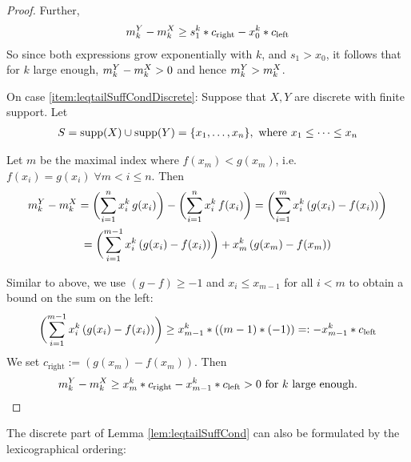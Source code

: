 \documentclass[a4paper]{scrreprt}
\begin{document}
\begin{proof}
        Further,
        \begin{gather*}
            m_k^Y - m_k^X
            \geq s_1^k * c_{\text{right}} - x_0^k * c_{\text{left}}
        \end{gather*}
        So since both expressions grow exponentially with $k$, and $s_1 > x_0$, it follows that for $k$ large enough, $m_k^Y - m_k^X > 0$ and hence $m_k^Y > m_k^X$.
        
        
        On case \ref{item:leqtailSuffCondDiscrete}: Suppose that $X, Y$ are discrete with finite support. Let 
        \begin{gather*}
            S = \operatorname{supp}(X) \cup \operatorname{supp}(Y) = \{x_1, \dots, x_n\}, \text{ where } x_1 \leq \dots \leq x_n
        \end{gather*}
        
        Let $m$ be the maximal index where $f(x_m) < g(x_m)$, i.e. $f(x_i) = g(x_i) \;\forall m < i \leq n$.
        Then
        \begin{multline*}
            m_k^Y - m_k^X
            = \biggl(\sum_{i=1}^{n} x_i^k \,g(x_i)\biggr) - \biggl(\sum_{i=1}^{n} x_i^k \,f(x_i)\biggr)
            = \biggl(\sum_{i=1}^{m} x_i^k \,(g(x_i) - f(x_i))\biggr) \\
            = \biggl(\sum_{i=1}^{m-1} x_i^k \,(g(x_i) - f(x_i))\biggr) + x_m^k \,(g(x_m) - f(x_m))
        \end{multline*}
        
        Similar to above, we use $(g -f) \geq -1$ and $x_i \leq x_{m-1}$ for all $i < m$ to obtain a bound on the sum on the left:
        \begin{gather*}
            \biggl(\sum_{i=1}^{m-1} x_i^k \,(g(x_i) - f(x_i))\biggr)
            \geq x_{m-1}^k * ((m-1) * (-1))
            =: -x_{m-1}^k * c_{\text{left}}
        \end{gather*}
        We set $c_{\text{right}} := (g(x_m) - f(x_m))$. Then
        \begin{gather*}
            m_k^Y - m_k^X \geq x_m^k * c_{\text{right}} -x_{m-1}^k * c_{\text{left}} > 0 \text{ for $k$ large enough.}
        \end{gather*}        
    \end{proof}

    The discrete part of Lemma \ref{lem:leqtailSuffCond} can also be formulated by the lexicographical ordering:
    
\end{document}
